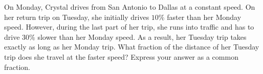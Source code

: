 On Monday, Crystal drives from San Antonio to Dallas at a constant speed. On her return trip on Tuesday, she initially drives $10\%$ faster than her Monday speed. However, during the last part of her trip, she runs into traffic and has to drive $30\%$ slower than her Monday speed. As a result, her Tuesday trip takes exactly as long as her Monday trip. What fraction of the distance of her Tuesday trip does she travel at the faster speed? Express your answer as a common fraction.
